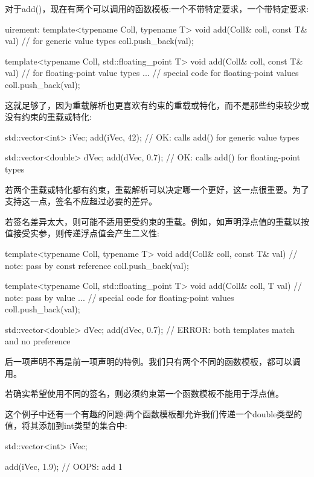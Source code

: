 对于add()，现在有两个可以调用的函数模板:一个不带特定要求，一个带特定要求:

\begin{cpp}
uirement:
template<typename Coll, typename T>
void add(Coll& coll, const T& val) // for generic value types
{
	coll.push_back(val);
}

template<typename Coll, std::floating_point T>
void add(Coll& coll, const T& val) // for floating-point value types
{
	... // special code for floating-point values
	coll.push_back(val);
}
\end{cpp}

这就足够了，因为重载解析也更喜欢有约束的重载或特化，而不是那些约束较少或没有约束的重载或特化:

\begin{cpp}
std::vector<int> iVec;
add(iVec, 42); // OK: calls add() for generic value types

std::vector<double> dVec;
add(dVec, 0.7); // OK: calls add() for floating-point types
\end{cpp}


若两个重载或特化都有约束，重载解析可以决定哪一个更好，这一点很重要。为了支持这一点，签名不应超过必要的差异。

若签名差异太大，则可能不适用更受约束的重载。例如，如声明浮点值的重载以按值接受实参，则传递浮点值会产生二义性:

\begin{cpp}
template<typename Coll, typename T>
void add(Coll& coll, const T& val) // note: pass by const reference
{
	coll.push_back(val);
}

template<typename Coll, std::floating_point T>
void add(Coll& coll, T val) // note: pass by value
{
	... // special code for floating-point values
	coll.push_back(val);
}

std::vector<double> dVec;
add(dVec, 0.7); // ERROR: both templates match and no preference
\end{cpp}

后一项声明不再是前一项声明的特例。我们只有两个不同的函数模板，都可以调用。

若确实希望使用不同的签名，则必须约束第一个函数模板不能用于浮点值。


这个例子中还有一个有趣的问题:两个函数模板都允许我们传递一个double类型的值，将其添加到int类型的集合中:

\begin{cpp}
std::vector<int> iVec;

add(iVec, 1.9); // OOPS: add 1
\end{cpp}

